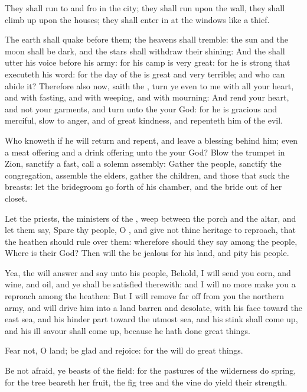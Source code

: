 \verse They shall run to and fro in the city; they shall run upon the wall, they shall climb up upon the houses; they shall enter in at the windows like a thief.

\verse The earth shall quake before them; the heavens shall tremble: the sun and the moon shall be dark, and the stars shall withdraw their shining: \verse And the \LORD shall utter his voice before his army: for his camp is very great: for he is strong that executeth his word: for the day of the \LORD is great and very terrible; and who can abide it?  \verse Therefore also now, saith the \LORD, turn ye even to me with all your heart, and with fasting, and with weeping, and with mourning: \verse And rend your heart, and not your garments, and turn unto the \LORD your God: for he is gracious and merciful, slow to anger, and of great kindness, and repenteth him of the evil.

\verse Who knoweth if he will return and repent, and leave a blessing behind him; even a meat offering and a drink offering unto the \LORD your God?  \verse Blow the trumpet in Zion, sanctify a fast, call a solemn assembly: \verse Gather the people, sanctify the congregation, assemble the elders, gather the children, and those that suck the breasts: let the bridegroom go forth of his chamber, and the bride out of her closet.

\verse Let the priests, the ministers of the \LORD, weep between the porch and the altar, and let them say, Spare thy people, O \LORD, and give not thine heritage to reproach, that the heathen should rule over them: wherefore should they say among the people, Where is their God?  \verse Then will the \LORD be jealous for his land, and pity his people.

\verse Yea, the \LORD will answer and say unto his people, Behold, I will send you corn, and wine, and oil, and ye shall be satisfied therewith: and I will no more make you a reproach among the heathen: \verse But I will remove far off from you the northern army, and will drive him into a land barren and desolate, with his face toward the east sea, and his hinder part toward the utmost sea, and his stink shall come up, and his ill savour shall come up, because he hath done great things.

\verse Fear not, O land; be glad and rejoice: for the \LORD will do great things.

\verse Be not afraid, ye beasts of the field: for the pastures of the wilderness do spring, for the tree beareth her fruit, the fig tree and the vine do yield their strength.

